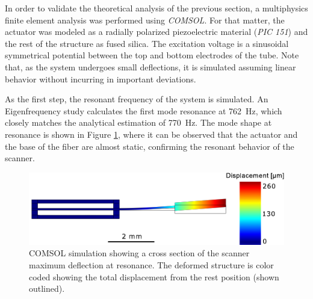 In order to validate the theoretical analysis of the previous section, a multiphysics finite element analysis was performed using \textit{COMSOL}. For that matter, the actuator was modeled as a radially polarized piezoelectric material (\textit{PIC 151}) and the rest of the structure as fused silica. The excitation voltage is a sinusoidal symmetrical potential between the top and bottom electrodes of the tube. Note that, as the system undergoes small deflections, it is simulated assuming linear behavior \cite{Fertis2006} without incurring in important deviations.

As the first step, the resonant frequency of the system is simulated. An Eigenfrequency study calculates the first mode resonance at \SI{762}{\hertz}, which closely matches the analytical estimation of \SI{770}{\hertz}. The mode shape at resonance is shown in Figure \ref{fig:defle}, where it can be observed that the actuator and the base of the fiber are almost static, confirming the resonant behavior of the scanner.

\begin{figure}[h!]\centering
      \includegraphics[width=10 cm]{figures/30_DesignSimulation/Mechanical/deflection.pdf}
      \caption{COMSOL simulation showing a cross section of the scanner maximum deflection at resonance. The deformed structure is color coded showing the total displacement from the rest position (shown outlined). }
      \label{fig:defle}
\end{figure}


